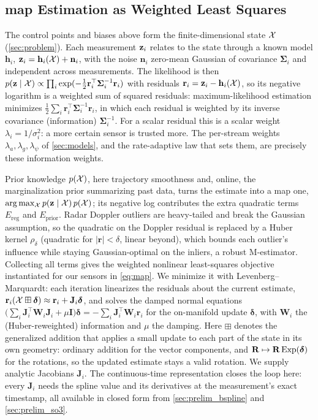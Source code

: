 \subsection{\ac{map} Estimation as Weighted Least Squares}
\label{sec:prelim_map}
The control points and biases above form the finite-dimensional state
$\mathcal{X}$ (\autoref{sec:problem}).  Each measurement $\mathbf{z}_i$ relates to
the state through a known model $\mathbf{h}_i$,
$\mathbf{z}_i = \mathbf{h}_i(\mathcal{X}) + \mathbf{n}_i$, with the noise
$\mathbf{n}_i$ zero-mean Gaussian of covariance
$\boldsymbol{\Sigma}_i$ and independent across measurements.  The
likelihood is then
$p(\mathbf{z}\mid\mathcal{X})\propto\prod_i
 \exp(-\tfrac12\mathbf{r}_i^{\top}\boldsymbol{\Sigma}_i^{-1}\mathbf{r}_i)$
with residuals $\mathbf{r}_i=\mathbf{z}_i-\mathbf{h}_i(\mathcal{X})$, so its negative
logarithm is a weighted sum of squared residuals: maximum-likelihood
estimation minimizes
$\tfrac12\sum_i\mathbf{r}_i^{\top}\boldsymbol{\Sigma}_i^{-1}\mathbf{r}_i$,
in which each residual is weighted by its inverse covariance
(information) $\boldsymbol{\Sigma}_i^{-1}$.  For a scalar residual this
is a scalar weight $\lambda_i=1/\sigma_i^2$: a more certain sensor is
trusted more.  The per-stream weights $\lambda_a,\lambda_g,\lambda_\psi$
of \autoref{sec:models}, and the rate-adaptive law that sets them, are
precisely these information weights.

Prior knowledge $p(\mathcal{X})$, here trajectory smoothness and, online, the
marginalization prior summarizing past data, turns the estimate into a
\ac{map} one, $\arg\max_{\mathcal{X}} p(\mathbf{z}\mid\mathcal{X})\,p(\mathcal{X})$; its negative
log contributes the extra quadratic terms $E_{\text{reg}}$ and
$E_{\text{prior}}$.  Radar Doppler outliers are heavy-tailed and break
the Gaussian assumption, so the quadratic on the Doppler residual is
replaced by a Huber kernel $\rho_\delta$ (quadratic for
$|\mathbf{r}|<\delta$, linear beyond), which bounds each outlier's
influence while staying Gaussian-optimal on the inliers, a robust
M-estimator.  Collecting all terms gives the weighted nonlinear
least-squares objective instantiated for our sensors in
\eqref{eq:map}.  We minimize it with Levenberg--Marquardt: each
iteration linearizes the residuals about the current estimate,
$\mathbf{r}_i(\mathcal{X}\boxplus\boldsymbol{\delta})\approx\mathbf{r}_i
 +\mathbf{J}_i\boldsymbol{\delta}$, and solves the damped normal
equations
$\bigl(\sum_i\mathbf{J}_i^{\top}\mathbf{W}_i\mathbf{J}_i
 +\mu\mathbf{I}\bigr)\boldsymbol{\delta}
 =-\sum_i\mathbf{J}_i^{\top}\mathbf{W}_i\mathbf{r}_i$
for the on-manifold update $\boldsymbol{\delta}$, with $\mathbf{W}_i$
the (Huber-reweighted) information and $\mu$ the damping.
Here $\boxplus$ denotes the generalized addition that applies
a small update to each part of the state in its own geometry: ordinary
addition for the vector components, and $\mathbf{R}\mapsto\mathbf{R}\,\mathrm{Exp}(\boldsymbol{\delta})$
for the rotations, so the updated estimate stays a valid rotation.  We supply
analytic Jacobians $\mathbf{J}_i$.  The continuous-time representation
closes the loop here: every $\mathbf{J}_i$ needs the spline value and
its derivatives at the measurement's exact timestamp, all available in
closed form from \autoref{sec:prelim_bspline} and
\autoref{sec:prelim_so3}.
